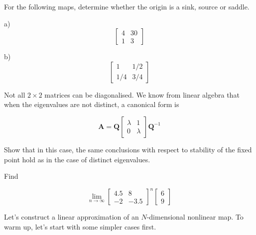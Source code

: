 \begin{exer}
For the following maps, determine whether the origin is a sink, source or saddle.

a) $$\begin{bmatrix}4 & 30 \\ 1 & 3 \end{bmatrix}$$

b) $$\begin{bmatrix}1 & 1/2 \\ 1/4 & 3/4 \end{bmatrix}$$

\end{exer}

\pagebreak

\begin{exer}
  Not all $2 \times 2$ matrices can be diagonalised. We know from linear algebra that when the eigenvalues are not distinct, a canonical form is
  
\begin{equation}
{\mathbf A} = 
{\mathbf Q}
\begin{bmatrix}
\lambda & 1 \\
0 & \lambda
\end{bmatrix} 
{\mathbf Q}^{-1}
\end{equation} 

Show that in this case, the same conclusions with respect to stability of the fixed point hold as in the case of distinct eigenvalues.
\end{exer}


\begin{exer}
Find

$$\lim_{n \to \infty}\begin{bmatrix}4.5 & 8 \\ -2 & -3.5 \end{bmatrix} ^ n \begin{bmatrix} 6 \\ 9 \end{bmatrix}$$

\end{exer}


\pagebreak


Let's construct a linear approximation of an $N$-dimensional nonlinear map. To warm up, let's start with some simpler cases first.

